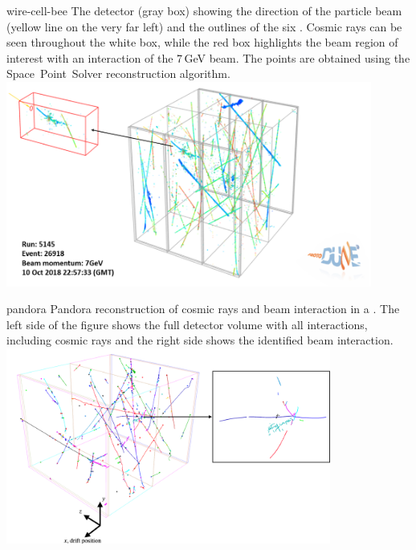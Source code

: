 \documentclass[../main-v1.tex]{subfiles}
\begin{document}
\begin{dunefigure}
{wire-cell-bee} %
{The  detector (gray box) showing 
the direction of the particle beam (yellow line on the very far left) and the outlines of the six . Cosmic rays
can be seen throughout the white box, while the red box highlights the beam region of interest with an interaction of the 7\,GeV beam. 
The \threed points are obtained using the Space~Point~Solver reconstruction algorithm.}
\includegraphics[width=0.9\textwidth]{graphics/IntroFigures/Fig_06_bee_event.png}
\end{dunefigure}


\begin{dunefigure}
{pandora}
{Pandora  reconstruction of cosmic rays and beam interaction in a  . The left side of the figure shows the full detector volume with all interactions, including cosmic rays and the right side shows the identified beam interaction.}
\includegraphics[width=0.8\textwidth]{graphics/IntroFigures/Fig_07_pandora.png}
\end{dunefigure}
\end{document}
